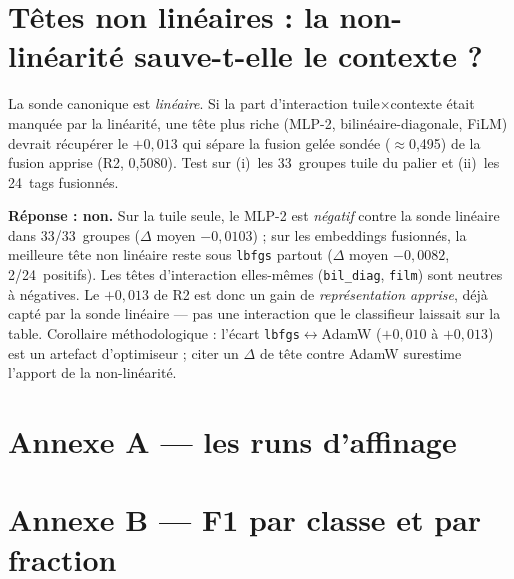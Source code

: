 \documentclass[10pt,a4paper]{article}
\begin{document}
\section{Têtes non linéaires : la non-linéarité sauve-t-elle le contexte ?}\label{sec:heads}

La sonde canonique est \emph{linéaire}. Si la part d'interaction
tuile$\times$contexte était manquée par la linéarité, une tête plus riche (MLP-2,
bilinéaire-diagonale, FiLM) devrait récupérer le $+0{,}013$ qui sépare la fusion
gelée sondée ($\approx$0,495) de la fusion apprise (R2, 0,5080). Test sur (i)~les
33~groupes tuile du palier et (ii)~les 24~tags fusionnés.





\noindent\textbf{Réponse : non.} Sur la tuile seule, le MLP-2 est \emph{négatif}
contre la sonde linéaire dans 33/33~groupes ($\Delta$ moyen $-0{,}0103$) ; sur les
embeddings fusionnés, la meilleure tête non linéaire reste sous \texttt{lbfgs}
partout ($\Delta$ moyen $-0{,}0082$, 2/24~positifs). Les têtes d'interaction
elles-mêmes (\texttt{bil\_diag}, \texttt{film}) sont neutres à négatives. Le
$+0{,}013$ de R2 est donc un gain de \emph{représentation apprise}, déjà capté par
la sonde linéaire — pas une interaction que le classifieur laissait sur la table.
Corollaire méthodologique : l'écart \texttt{lbfgs}$\leftrightarrow$AdamW
($+0{,}010$ à $+0{,}013$) est un artefact d'optimiseur ; citer un $\Delta$ de tête
contre AdamW surestime l'apport de la non-linéarité.

\appendix
\section{Annexe A — les runs d'affinage}

\begin{landscape}
\footnotesize

\end{landscape}

\section{Annexe B — F1 par classe et par fraction}
\end{document}
